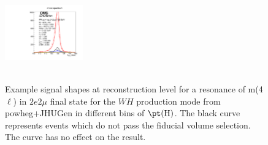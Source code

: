 \begin{figure}[htb]
\begin{center}
{      \includegraphics[width=0.3\textwidth,angle=0]{Figures/Appendix//WH_powheg_JHUgen_125_2e2mu_pT4l_genbin4_recobin4_effs_genWeight*pileupWeight*dataMCWeight.pdf}
      \label{fig:sigfits-pT4l-WH-powheg15-JHUgen-125-maintext:e}
    }
     \\
    \\
    \caption{ Example signal shapes at reconstruction level for a resonance of m(4$\ell$) in $2e2\mu$ final state for the $WH$ production mode from {\sc powheg+JHUGen} in different bins of $\pt(\mathrm{H})$. The black curve represents events which do not pass the fiducial volume selection. The curve has no effect on the result.
    }
  \label{fig:sigfits-pT4l-WH-powheg15-JHUgen-125-maintext}
 \end{center}
\end{figure} \clearpage

